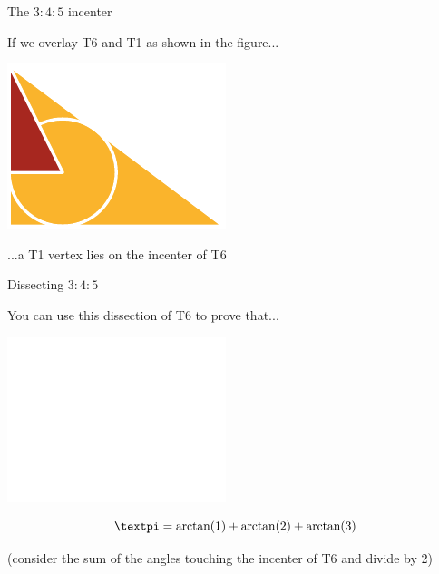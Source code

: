 \documentclass[14pt]{beamer}
\begin{document}
    \begin{frame}{The $3\!\!:\!\!4\!\!:\!\!5$ incenter}
        \begin{center}
            If we overlay T6 and T1 as shown in the figure...

            \bigskip \bigskip

            \includegraphics[height=18ex]{figures/figure006b.pdf}

            \bigskip \bigskip

            ...a T1 vertex lies on the incenter of T6
        \end{center}
    \end{frame}


    \begin{frame}{Dissecting $3\!\!:\!\!4\!\!:\!\!5$}
        \begin{center}
            You can use this dissection of T6 to prove that...

            \bigskip\bigskip

            \includegraphics[height=18ex]{figures/figure006c.pdf}\vspace{-1em}

            $$\text{\textpi} = \arctan{\!\left(1\right)} + \arctan{\!\left(2\right)} + \arctan{\!\left(3\right)}$$

            {\footnotesize(consider the sum of the angles touching the incenter of T6 and divide by 2)}
        \end{center}
    \end{frame}

\end{document}
